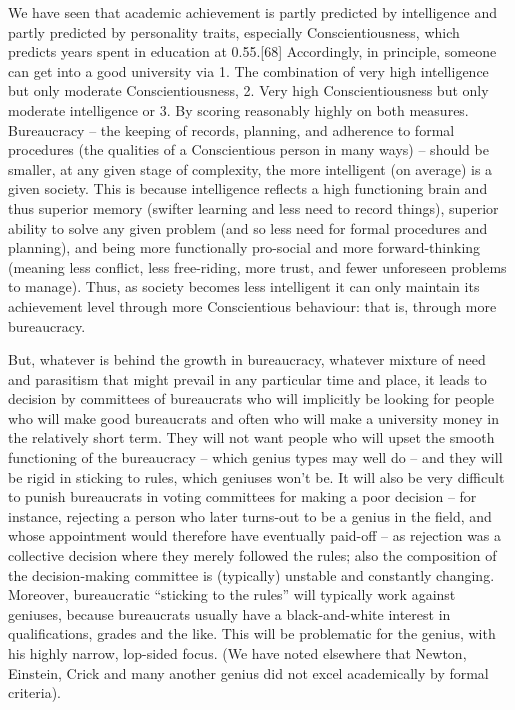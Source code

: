 \documentclass[
]{book}
\begin{document}
We have seen that academic achievement is partly predicted by intelligence and partly predicted by personality traits, especially Conscientiousness, which predicts years spent in education at 0.55.{[}68{]} Accordingly, in principle, someone can get into a good university via 1. The combination of very high intelligence but only moderate Conscientiousness, 2. Very high Conscientiousness but only moderate intelligence or 3. By scoring reasonably highly on both measures. Bureaucracy -- the keeping of records, planning, and adherence to formal procedures (the qualities of a Conscientious person in many ways) -- should be smaller, at any given stage of complexity, the more intelligent (on average) is a given society. This is because intelligence reflects a high functioning brain and thus superior memory (swifter learning and less need to record things), superior ability to solve any given problem (and so less need for formal procedures and planning), and being more functionally pro-social and more forward-thinking (meaning less conflict, less free-riding, more trust, and fewer unforeseen problems to manage). Thus, as society becomes less intelligent it can only maintain its achievement level through more Conscientious behaviour: that is, through more bureaucracy.

But, whatever is behind the growth in bureaucracy, whatever mixture of need and parasitism that might prevail in any particular time and place, it leads to decision by committees of bureaucrats who will implicitly be looking for people who will make good bureaucrats and often who will make a university money in the relatively short term. They will not want people who will upset the smooth functioning of the bureaucracy -- which genius types may well do -- and they will be rigid in sticking to rules, which geniuses won't be. It will also be very difficult to punish bureaucrats in voting committees for making a poor decision -- for instance, rejecting a person who later turns-out to be a genius in the field, and whose appointment would therefore have eventually paid-off -- as rejection was a collective decision where they merely followed the rules; also the composition of the decision-making committee is (typically) unstable and constantly changing. Moreover, bureaucratic ``sticking to the rules'' will typically work against geniuses, because bureaucrats usually have a black-and-white interest in qualifications, grades and the like. This will be problematic for the genius, with his highly narrow, lop-sided focus. (We have noted elsewhere that Newton, Einstein, Crick and many another genius did not excel academically by formal criteria).
\end{document}
